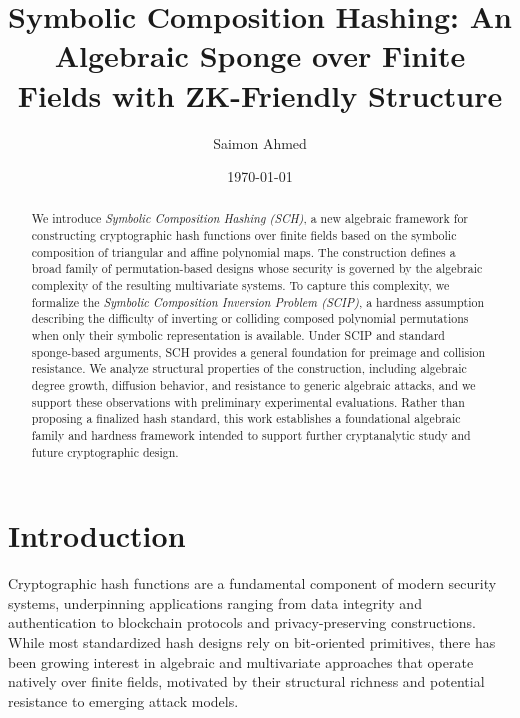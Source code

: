 ﻿\documentclass[english]{aucmcs}
\title[Symbolic Composition Hashing]{Symbolic Composition Hashing: An Algebraic Sponge over Finite Fields with ZK-Friendly Structure}
\author[S. Ahmed]{Saimon Ahmed}
\begin{document}
\begin{abstract}
We introduce \emph{Symbolic Composition Hashing (SCH)}, a new algebraic framework for constructing cryptographic hash functions over finite fields based on the symbolic composition of triangular and affine polynomial maps. The construction defines a broad family of permutation-based designs whose security is governed by the algebraic complexity of the resulting multivariate systems. To capture this complexity, we formalize the \emph{Symbolic Composition Inversion Problem (SCIP)}, a hardness assumption describing the difficulty of inverting or colliding composed polynomial permutations when only their symbolic representation is available. Under SCIP and standard sponge-based arguments, SCH provides a general foundation for preimage and collision resistance. We analyze structural properties of the construction, including algebraic degree growth, diffusion behavior, and resistance to generic algebraic attacks, and we support these observations with preliminary experimental evaluations. Rather than proposing a finalized hash standard, this work establishes a foundational algebraic family and hardness framework intended to support further cryptanalytic study and future cryptographic design.
\end{abstract}



\date{\today}

\maketitle



\section{Introduction}

Cryptographic hash functions are a fundamental component of modern security systems, underpinning applications ranging from data integrity and authentication to blockchain protocols and privacy-preserving constructions. While most standardized hash designs rely on bit-oriented primitives, there has been growing interest in algebraic and multivariate approaches that operate natively over finite fields, motivated by their structural richness and potential resistance to emerging attack models.
\end{document}
